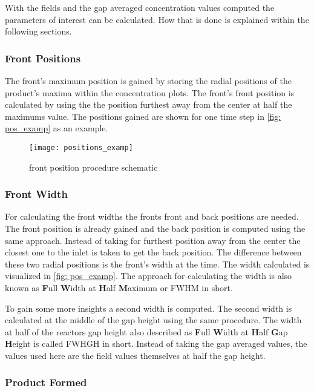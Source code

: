 \documentclass[../thesis.tex]{subfiles}
\begin{document}
With the fields and the gap averaged concentration values computed the parameters of interest can be calculated. How that is done is explained within the following sections.

\subsubsection{Front Positions}

The front's maximum position is gained by storing the radial positions of the product's maxima within the concentration plots. The front's front position is calculated by using the the position furthest away from the center at half the maximums value. The positions gained are shown for one time step in \autoref{fig: pos_examp} as an example.

\begin{figure}[htb]
	\centering
	\texttt{[image: positions\_examp]}
	\caption{front position procedure schematic}
	\label{fig: pos_examp}
\end{figure}

\subsubsection{Front Width}

For calculating the front widths the fronts front and back positions are needed. The front position is already gained and the back position is computed using the same approach. Instead of taking for furthest position away from the center the closest one to the inlet is taken to get the back position. The difference between these two radial positions is the front's width at the time. The width calculated is visualized in \autoref{fig: pos_examp}. The approach for calculating the width is also known as \textbf{F}ull \textbf{W}idth at \textbf{H}alf \textbf{M}aximum or FWHM in short.

To gain some more insights a second width is computed. The second width is calculated at the middle of the gap height using the same procedure. The width at half of the reactors gap height also described as \textbf{F}ull \textbf{W}idth at \textbf{H}alf \textbf{G}ap \textbf{H}eight is called FWHGH in short. Instead of taking the gap averaged values, the values used here are the field values themselves at half the gap height.

\subsubsection{Product Formed}
\end{document}
